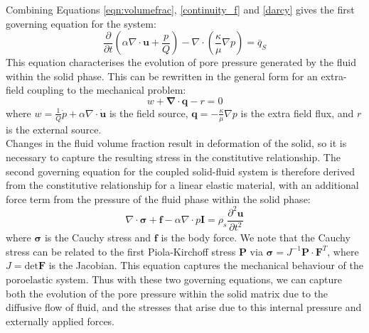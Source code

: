 \documentclass[oneside,11pt,times]{book}
\begin{document}
Combining Equations \eqref{eqn:volumefrac}, \eqref{continuity_f} and \eqref{darcy} gives the first governing equation for the system:
\begin{equation}
 \frac{\partial}{\partial t} \left( \alpha\nabla\cdot\bm{u} + \frac{p}{Q} \right) - \nabla\cdot \left( \frac{\kappa}{\mu} \nabla p \right) = \bar{q}_S
\label{eqn:governingflux}
\end{equation}
This equation characterises the evolution of pore pressure generated by the fluid within the solid phase. This can be rewritten in the general form for an extra-field coupling to the mechanical problem:
\begin{equation} \label{eqn:flux2}
w+\bm{\nabla}\cdot\bm{q}-r=0 
\end{equation}
\noindent where $w = \frac{1}{Q}\dot{p} + \alpha\nabla\cdot\bm{\dot{u}}$ is the field source,  $\bm{q} = -\frac{\kappa}{\mu} \nabla p$ is the extra field flux,  and $r$ is the external source. \\

Changes in the fluid volume fraction result in deformation of the solid, so it is necessary to capture the resulting stress in the constitutive relationship. The second governing equation for the coupled solid-fluid system is therefore derived from the constitutive relationship for a linear elastic material, with an additional force term from the pressure of the fluid phase within the solid phase: 
\begin{equation}
\nabla\cdot\bm{\sigma} + \bm{f} - \alpha \nabla \cdot p \bm{I} = \rho_{s} \frac{\partial^2\bm{u}}{\partial t^2} 
\label{eqn:governingmech}
\end{equation} 
where $\bm{\sigma}$ is the Cauchy stress and $\bm{f}$ is the body force. We note that the Cauchy stress can be related to the first Piola-Kirchoff stress $\bm{P}$ via $\bm{\sigma} = J^{-1} \bm{P} \cdot \bm{F}^{T}$, where $J = \text{det} \bm{F}$ is the Jacobian. This equation captures the mechanical behaviour of the poroelastic system. Thus with these two governing equations, we can capture both the evolution of the pore pressure within the solid matrix due to the diffusive flow of fluid, and the stresses that arise due to this internal pressure and externally applied forces.\\
\end{document}
